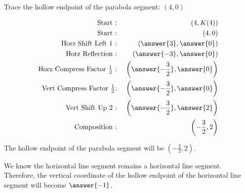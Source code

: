 \documentclass{ximera}
\begin{document}
\begin{procedure} 



Trace the hollow endpoint of the parabola segment: $(4, 0)$





\begin{align*}
\text{Start :} & \text{  } & (4, K(4))  \\
\text{Start :} & \text{  } & (4, 0) \\
\text{Horz Shift Left $1$ :} & \text{  } & \left( \answer{3}, \answer{0} \right)   \\
\text{Horz Reflection :} & \text{  } & \left( \answer{-3}, \answer{0} \right)   \\
\text{Horz Compress Factor $\tfrac{1}{2}$ :}  & \text{  } & \left( \answer{-\frac{3}{2}}, \answer{0} \right)   \\
\text{Vert Compress Factor $\tfrac{1}{2}$:} & \text{  } & \left( \answer{-\frac{3}{2}}, \answer{0} \right)   \\
\text{Vert Shift Up $2$ :} & \text{  } & \left( \answer{-\frac{3}{2}}, \answer{2} \right)   \\
\text{Composition :} & \text{  } & \left( -\frac{3}{2}, 2 \right)   
\end{align*}


The hollow endpoint of the parabola segment will be $\left( -\frac{3}{2}, 2 \right)$.

\end{procedure}
















\begin{question} 

We know the horizontal line segment remains a horizontal line segment. Therefore, the vertical coordinate of the hollow endpoint of the horizontal line segment will become $\answer{-1}$.

\end{question}




  
\end{document}
